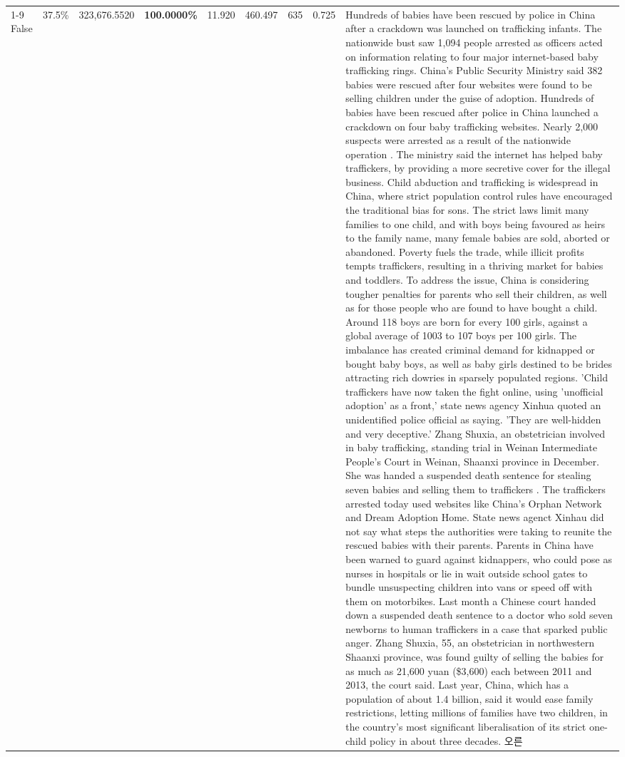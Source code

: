 \begin{table}[H]
\begin{tabular}{lllrlllll}
\cline{1-9}
False & 37.5\% & 323,676.5520 & \bfseries \color{red} 100.0000\% & 11.920 & 460.497 & 635 & 0.725 & Hundreds of babies have been rescued by police in China after a crackdown was launched on trafficking infants. The nationwide bust saw 1,094 people arrested as officers acted on information relating to four major internet-based baby trafficking rings. China's Public Security Ministry said 382 babies were rescued after four websites were found to be selling children under the guise of adoption. Hundreds of babies have been rescued after police in China launched a crackdown on four baby trafficking websites. Nearly 2,000 suspects were arrested as a result of the nationwide operation . The ministry said the internet has helped baby traffickers, by providing a more secretive cover for the illegal business. Child abduction and trafficking is widespread in China, where strict population control rules have encouraged the traditional bias for sons. The strict laws limit many families to one child, and with boys being favoured as heirs to the family name, many female babies are sold, aborted or abandoned. Poverty fuels the trade, while illicit profits tempts traffickers, resulting in a thriving market for babies and toddlers. To address the issue, China is considering tougher penalties for parents who sell their children, as well as for those people who are found to have bought a child. Around 118 boys are born for every 100 girls, against a global average of 1003 to 107 boys per 100 girls. The imbalance has created criminal demand for kidnapped or bought baby boys, as well as baby girls destined to be brides attracting rich dowries in sparsely populated regions. 'Child traffickers have now taken the fight online, using 'unofficial adoption' as a front,' state news agency Xinhua quoted an unidentified police official as saying. 'They are well-hidden and very deceptive.' Zhang Shuxia, an obstetrician involved in baby trafficking, standing trial in Weinan Intermediate People's Court in Weinan, Shaanxi province in December. She was handed a suspended death sentence for stealing seven babies and selling them to traffickers . The traffickers arrested today used websites like China's Orphan Network and Dream Adoption Home. State news agenct Xinhau did not say what steps the authorities were taking to reunite the rescued babies with their parents. Parents in China have been warned to guard against kidnappers, who could pose as nurses in hospitals or lie in wait outside school gates to bundle unsuspecting children into vans or speed off with them on motorbikes. Last month a Chinese court handed down a suspended death sentence to a doctor who sold seven newborns to human traffickers in a case that sparked public anger. Zhang Shuxia, 55, an obstetrician in northwestern Shaanxi province, was found guilty of selling the babies for as much as 21,600 yuan (\$3,600) each between 2011 and 2013, the court said. Last year, China, which has a population of about 1.4 billion, said it would ease family restrictions, letting millions of families have two children, in the country's most significant liberalisation of its strict one-child policy in about three decades. 오른 \\

\end{tabular}
\end{table}
